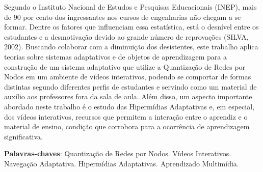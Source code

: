 \begin{resumo}
Segundo o Instituto Nacional de Estudos e Pesquisas Educacionais (INEP), mais de 90 por cento dos ingressantes nos cursos de engenharias não chegam a se formar. Dentre os fatores que influenciam essa estatística, está o desnível entre os estudantes e a desmotivação devido ao grande número de reprovações (SILVA, 2002). Buscando colaborar com a diminuição dos desistentes, este trabalho aplica teorias sobre sistemas adaptativos e de objetos de aprendizagem para a construção de um sistema adaptativo que utilize a Quantização de Redes por Nodos em um ambiente de vídeos interativos, podendo se comportar de formas distintas segundo diferentes perfis de estudantes e servindo como um material de auxílio aos professores fora da sala de aula. Além disso, um aspecto importante abordado neste trabalho é o estudo das Hipermídias Adaptativas e, em especial, dos vídeos interativos, recursos que permitem a interação entre o aprendiz e o material de ensino, condição que corrobora para a ocorrência de aprendizagem significativa.

 \vspace{\onelineskip}
    
 \noindent
 \textbf{Palavras-chaves}: Quantização de Redes por Nodos. Vídeos Interativos. Navegação Adaptativa. Hipermídias Adaptativas. Aprendizado Multimídia.
\end{resumo}
